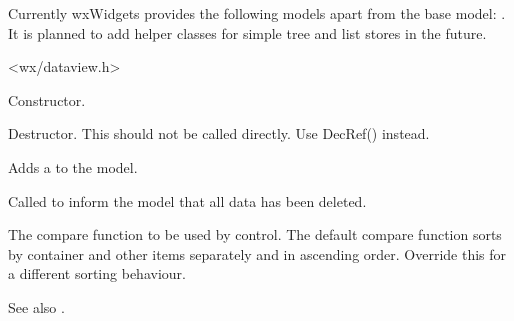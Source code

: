 Currently wxWidgets provides the following models apart
from the base model: 
. 
It is planned to add helper classes for simple tree
and list stores in the future.




<wx/dataview.h>






\label{wxdataviewmodelwxdataviewmodel}


Constructor.

\label{wxdataviewmodeldtor}


Destructor. This should not be called directly. Use DecRef() instead.


\label{wxdataviewmodeladdnotifier}


Adds a 
to the model.

\label{wxdataviewmodelcleared}


Called to inform the model that all data has been deleted.

\label{wxdataviewmodelcompare}


The compare function to be used by control. The default compare function
sorts by container and other items separately and in ascending order.
Override this for a different sorting behaviour.

See also .

